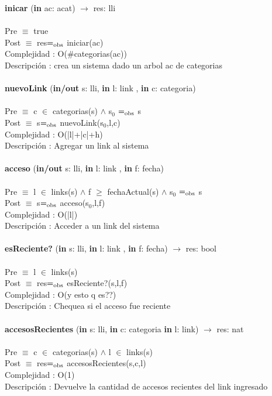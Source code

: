 \documentclass[10pt, a4paper]{article}
\begin{document}
	\textbf{inicar} (\textbf{in} ac: acat) $\longrightarrow$ res: lli\\\\
	Pre $\equiv$ {true}\\
	Post $\equiv$ {res$=_{\mathrm{obs}}$ iniciar(ac)}\\
	Complejidad : O($\#$categorias(ac))\\
	Descripci\'{o}n : crea un sistema dado un arbol ac de categorias\\\\
	
	\textbf{nuevoLink} (\textbf{in/out} s: lli, \textbf{in} l: link , \textbf{in} c: categoria) \\\\
	Pre $\equiv$ {c $\in$ categorias(s) $\wedge$ s${_0}$ $=_{\mathrm{obs}}$ s}\\
	Post $\equiv$ {s$=_{\mathrm{obs}}$ nuevoLink(s${_0}$,l,c)}\\
	Complejidad : O(|l|+|c|+h)\\
	Descripci\'{o}n : Agregar un link al sistema\\\\
	
	\textbf{acceso} (\textbf{in/out} s: lli, \textbf{in} l: link , \textbf{in} f: fecha) \\\\
	Pre $\equiv$ {l $\in$ links(s) $\wedge$ f $\geq$ fechaActual(s) $\wedge$ s${_0}$ $=_{\mathrm{obs}}$ s}\\
	Post $\equiv$ {s$=_{\mathrm{obs}}$ acceso(s${_0}$,l,f)}\\
	Complejidad : O(|l|)\\
	Descripci\'{o}n : Acceder a un link del sistema\\\\
		
	\textbf{esReciente?} (\textbf{in} s: lli, \textbf{in} l: link , \textbf{in} f: fecha) $\longrightarrow$ res: bool\\\\
	Pre $\equiv$ {l $\in$ links(s)}\\
	Post $\equiv$ {res$=_{\mathrm{obs}}$ esReciente?(s,l,f)}\\
	Complejidad : O(y esto q es??)\\
	Descripci\'{o}n : Chequea si el acceso fue reciente\\\\
	
	\textbf{accesosRecientes} (\textbf{in} s: lli, \textbf{in} c: categoria \textbf{in} l: link) $\longrightarrow$ res: nat\\\\
	Pre $\equiv$ {c $\in$ categorias(s) $\wedge$ l $\in$ links(s)}\\
	Post $\equiv$ {res$=_{\mathrm{obs}}$ accesosRecientes(s,c,l)}\\
	Complejidad : O(1)\\
	Descripci\'{o}n : Devuelve la cantidad de accesos recientes del link ingresado\\\\
	
\end{document}
